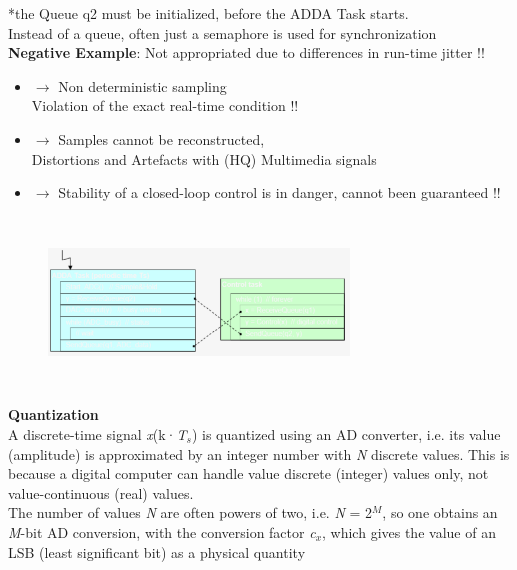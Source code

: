 *the Queue q2 must be initialized, before the ADDA Task starts.\\

Instead of a queue, often just a semaphore is used for synchronization \\

\textbf{Negative Example}: Not appropriated due to differences in run-time  jitter !!\\

\begin{itemize}
\item $\rightarrow$ Non deterministic sampling \\ Violation of the exact real-time condition !!
\item $\rightarrow$ Samples cannot be reconstructed, \\ Distortions and Artefacts with (HQ) Multimedia signals
\item $\rightarrow$ Stability of a closed-loop control is in danger, cannot been guaranteed !!
\end{itemize}

    \begin{figure}[h]
    \centering
    \includegraphics[width=8cm, height=4.5cm]{Images/image139.png}
    \label{fig:Fig }
    \end{figure}

{\rot\bf Quantization}\\

A discrete-time signal \textit{x}(k·\textit{T${}_{s}$}) is quantized using an AD converter, i.e. its value (amplitude) is approximated by an integer number with \textit{N} discrete values. This is because a digital computer can handle value discrete (integer) values only, not value-continuous (real) values.\\

The number of values \textit{N} are often powers of two, i.e. \textit{N} = 2\textit{${}^{M}$}, so one obtains an \textit{M}-bit AD conversion, with the conversion factor \textit{c${}_{x}$}, which gives the value of an LSB (least significant bit) as a physical quantity\\

